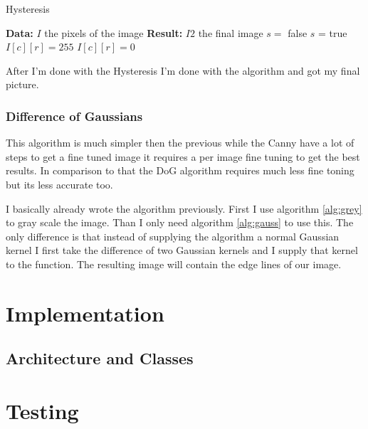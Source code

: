 \begin{algorithm}[H]
\caption{Hysteresis}
\label{alg:hys}
\begin{algorithmic}
\State \textbf{Data:} $I$ the pixels of the image
\State \textbf{Result:} $I2$ the final image
\State $s =$ false
\State $s$ = true
\EndIf
\EndFor
\EndFor
{}
\State $I[c][r] = 255$
\Else
\State $I[c][r] = 0$
\EndIf
\EndFor
\end{algorithmic}
\end{algorithm}

After I'm done with the Hysteresis I'm done with the algorithm and got my final picture.

\subsubsection{Difference of Gaussians}

This algorithm is much simpler then the previous while the \ac{Canny} have a lot of steps to get a fine tuned image it requires a per image fine tuning to get the best results. In comparison to that the \ac{DoG} algorithm requires much less fine toning but its less accurate too.

I basically already wrote the algorithm previously. First I use algorithm \ref{alg:grey} to gray scale the image. Than I only need algorithm \ref{alg:gauss} to use this. The only difference is that instead of supplying the algorithm a normal Gaussian kernel I first take the difference of two Gaussian kernels and I supply that kernel to the function. The resulting image will contain the edge lines of our image.

\section{Implementation}

\subsection{Architecture and Classes}
\label{chap:Imp_Arc}



\section{Testing}
\label{chap:dev_testing}

